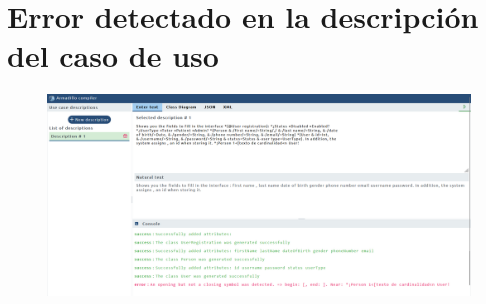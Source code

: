 \section{Error detectado en la descripción del caso de uso}
\begin{figure}[H]
	\includegraphics[width=15cm]{img/anexo7.png}
	\label{fig:anexo7}
\end{figure} 